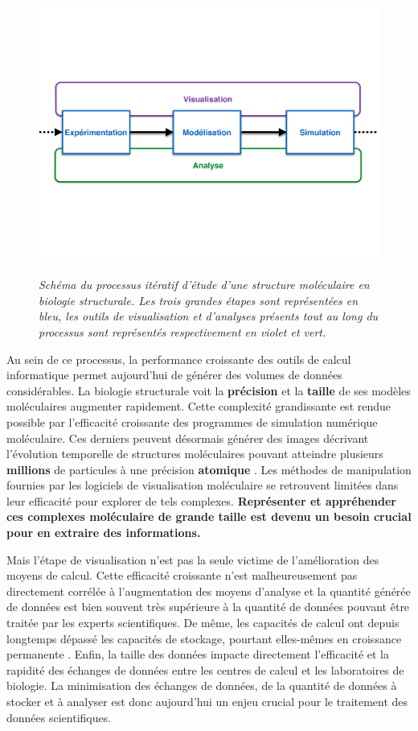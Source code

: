 \begin{figure}[h]
  \centering
  {\includegraphics[width=.75\linewidth]{./figures/ch1/process_bio_struct}}
    \caption{{\it Schéma du processus itératif d'étude d'une structure moléculaire en biologie structurale. Les trois grandes étapes sont représentées en bleu, les outils de visualisation et d'analyses présents tout au long du processus sont représentés respectivement en violet et vert.}}
  \label{Fig:VR_pubmed_trend}
  \hspace{0.2cm}
\end{figure}

Au sein de ce processus, la performance croissante des outils de calcul informatique permet aujourd'hui de générer des volumes de données considérables. La biologie structurale voit la \textbf{précision} et la \textbf{taille} de ses modèles moléculaires augmenter rapidement. Cette complexité grandissante est rendue possible par l'efficacité croissante des programmes de simulation numérique moléculaire. Ces derniers peuvent désormais générer des images décrivant l'évolution temporelle de structures moléculaires pouvant atteindre plusieurs \textbf{millions} de particules à une précision \textbf{atomique} \cite{sanbonmatsu2013molecular}. Les méthodes de manipulation fournies par les logiciels de visualisation moléculaire se retrouvent limitées dans leur efficacité pour explorer de tels complexes.
\textbf{Représenter et appréhender ces complexes moléculaire de grande taille est devenu un besoin crucial pour en extraire des informations.} 

Mais l'étape de visualisation n'est pas la seule victime de l'amélioration des moyens de calcul. Cette efficacité croissante n'est malheureusement pas directement corrélée à l'augmentation des moyens d'analyse et la quantité générée de données est bien souvent très supérieure à la quantité de données pouvant être traitée par les experts scientifiques. De même, les capacités de calcul ont depuis longtemps dépassé les capacités de stockage, pourtant elles-mêmes en croissance permanente \cite{zimmerman2014data}. Enfin, la taille des données impacte directement l'efficacité et la rapidité des échanges de données entre les centres de calcul et les laboratoires de biologie. La minimisation des échanges de données, de la quantité de données à stocker et à analyser est donc aujourd'hui un enjeu crucial pour le traitement des données scientifiques.

